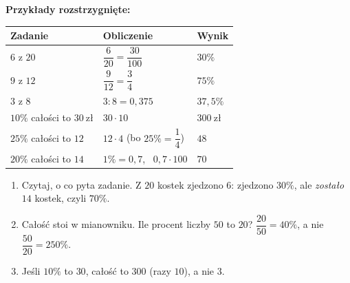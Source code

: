 \documentclass[11pt,a4paper]{article}
\begin{document}
\vspace{-0.2em}
\textbf{Przykłady rozstrzygnięte:}
\begin{center}
\renewcommand{\arraystretch}{1.5}
\begin{tabular}{@{}lll@{}}
\toprule
Zadanie & Obliczenie & Wynik \\
\midrule
$6$ z $20$ & $\dfrac{6}{20}=\dfrac{30}{100}$ & $30\%$ \\[4pt]
$9$ z $12$ & $\dfrac{9}{12}=\dfrac{3}{4}$ & $75\%$ \\[4pt]
$3$ z $8$ & $3:8=0{,}375$ & $37{,}5\%$ \\
$10\%$ całości to $30\ \text{zł}$ & $30\cdot 10$ & $300\ \text{zł}$ \\
$25\%$ całości to $12$ & $12\cdot 4$ (bo $25\%=\dfrac{1}{4}$) & $48$ \\
$20\%$ całości to $14$ & $1\%=0{,}7$, \ $0{,}7\cdot 100$ & $70$ \\
\bottomrule
\end{tabular}
\end{center}

\begin{pulapka}
\begin{enumerate}[leftmargin=*, itemsep=2pt]
  \item Czytaj, o co pyta zadanie. Z $20$ kostek zjedzono $6$: zjedzono $30\%$, ale \emph{zostało} $14$ kostek, czyli $70\%$.
  \item Całość stoi w mianowniku. Ile procent liczby $50$ to $20$? $\dfrac{20}{50}=40\%$, a nie $\dfrac{50}{20}=250\%$.
  \item Jeśli $10\%$ to $30$, całość to $300$ (razy $10$), a nie $3$.
\end{enumerate}
\end{pulapka}
\end{document}
